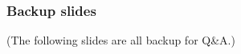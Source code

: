 \documentclass[xcolor={dvipsnames}]{beamer}
\begin{document}
%
%



\begin{frame}
\frametitle{Backup slides}
\begin{center}
\large
(The following slides are all backup for Q\&A.)
\end{center}
\end{frame}
\end{document}
